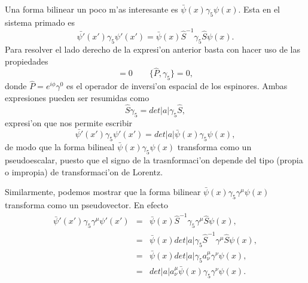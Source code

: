 Una forma bilinear un poco m'as interesante es $\bar{\psi}(x)\gamma_5\psi(x)$.
Esta en el sistema primado es
\begin{equation}
\bar{\psi'}(x')\gamma_5\psi'(x')=\bar{\psi}(x)\hat S^{-1}\gamma_5\hat S\psi(x).
\end{equation}
Para resolver el lado derecho de la expresi'on anterior basta con hacer uso de
las propiedades
\begin{equation}
[\hat S,\gamma_5]=0\qquad\{\hat P,\gamma_5\}=0,
\end{equation}
donde $\hat P=e^{i\phi}\gamma^0$ es el operador de inversi'on espacial de los
espinores. Ambas expresiones pueden ser resumidas como
\begin{equation}
\hat S\gamma_5=det|a|\gamma_5\hat S,
\end{equation} 
expresi'on que nos permite escribir
\begin{equation}
\bar{\psi'}(x')\gamma_5\psi'(x')=det|a|\bar{\psi}(x)\gamma_5\psi(x),
\end{equation}
de modo que la forma bilineal $\bar{\psi}(x)\gamma_5\psi(x)$ transforma como un
pseudoescalar, puesto que el signo de la trasnformaci'on depende del tipo
(propia o impropia) de transformaci'on de Lorentz.

Similarmente, podemos mostrar que la forma bilinear
$\bar{\psi}(x)\gamma_5\gamma^\mu\psi(x)$ transforma como un pseudovector. En
efecto
\begin{eqnarray}
\bar{\psi}'(x')\gamma_5\gamma^\mu\psi'(x')&=&\bar{\psi}(x)\hat
S^{-1}\gamma_5\gamma^\mu\hat S\psi(x),
\nonumber\\
&=&\bar{\psi}(x)det|a|\gamma_5 \hat S^{-1}\gamma^\mu\hat S\psi(x),
\nonumber\\
&=&\bar{\psi}(x)det|a|\gamma_5 a^\mu_\nu\gamma^\nu\psi(x),
\nonumber\\
&=&det|a|a^\mu_\nu\bar{\psi}(x)\gamma_5\gamma^\nu\psi(x).
\end{eqnarray}

